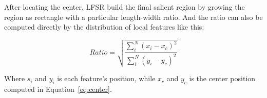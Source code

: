 After locating the center, LFSR build the final salient region by growing the region as rectangle with a particular length-width ratio. And the ratio can also be computed directly by the distribution of local features like this:

{\begin{equation} \label{eq:ratio}
Ratio = \sqrt{\frac{\sum_{i}^{N}\left ( x_{i}-x_{c} \right )^{2}}{\sum_{i}^{N}\left ( y_{i}-y_{c} \right )^{2}}}
\end{equation}}

Where $s_{i}$ and $y_{i}$ is each feature's position, while $x_{c}$ and $y_{c}$ is the center position computed in Equation~\ref{eq:center}.